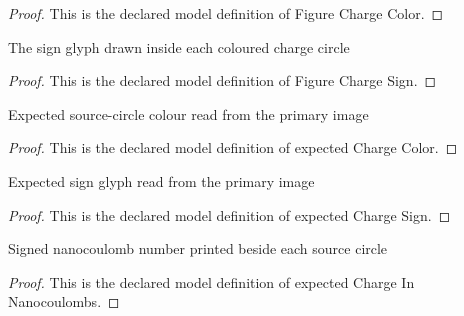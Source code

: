 \begin{proof}
  This is the declared model definition of Figure Charge Color.
\end{proof}
\begin{definition}
  \label{def:physics:phyx-mini-0859:phyxminiproblems-problemphyxmini0859-figurechargesign}
  The sign glyph drawn inside each coloured charge circle
\end{definition}
\begin{proof}
  This is the declared model definition of Figure Charge Sign.
\end{proof}
\begin{definition}
  \label{def:physics:phyx-mini-0859:phyxminiproblems-problemphyxmini0859-expectedchargecolor}
  Expected source-circle colour read from the primary image
\end{definition}
\begin{proof}
  This is the declared model definition of expected Charge Color.
\end{proof}
\begin{definition}
  \label{def:physics:phyx-mini-0859:phyxminiproblems-problemphyxmini0859-expectedchargesign}
  Expected sign glyph read from the primary image
\end{definition}
\begin{proof}
  This is the declared model definition of expected Charge Sign.
\end{proof}
\begin{definition}
  \label{def:physics:phyx-mini-0859:phyxminiproblems-problemphyxmini0859-expectedchargeinnanocoulombs}
  Signed nanocoulomb number printed beside each source circle
\end{definition}
\begin{proof}
  This is the declared model definition of expected Charge In Nanocoulombs.
\end{proof}
